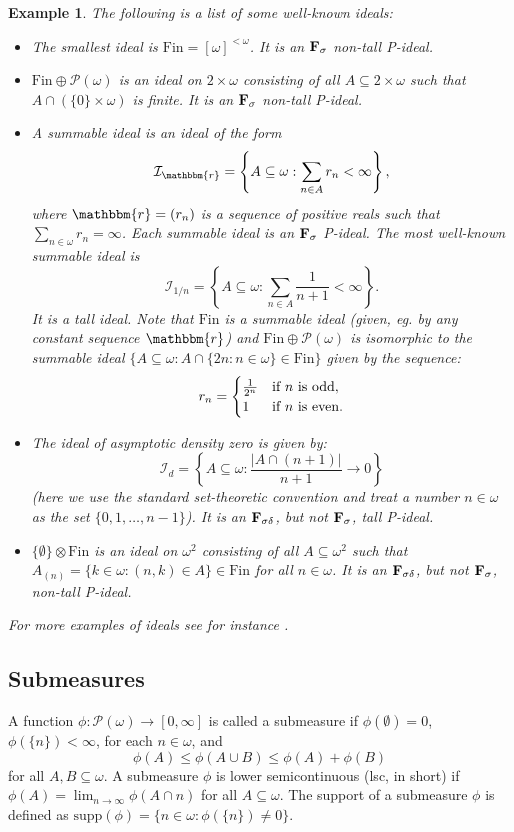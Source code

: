 \documentclass{amsart}
\newcommand{\I}{\mathcal{I}}
\newcommand{\Fin}{\mathrm{Fin}}
\newcommand{\supp}{\mathrm{supp}}
\newcommand{\w}{\mathbbm}
\newtheorem{example}[theorem]{Example}
\begin{document}
\begin{example}
The following is a list of some well-known ideals:
\begin{itemize}
    \item The smallest ideal is $\Fin=[\omega]^{<\omega}$.  It is an $\bf{F_\sigma}$ non-tall P-ideal.
    \item $\Fin\oplus\mathcal{P}(\omega)$ is an ideal on $2\times\omega$ consisting of all $A\subseteq 2\times\omega$ such that $A\cap(\{0\}\times\omega)$ is finite. It is an $\bf{F_\sigma}$ non-tall P-ideal. 
    \item A summable ideal is an ideal of the form
\[
\I_{\w{r}}=\left\{A\subseteq\omega:\sum_{n\in A}r_n<\infty\right\},
\]
where $\w{r}=(r_n)$ is a sequence of positive reals such that $\sum_{n\in\omega}r_n=\infty$. Each summable ideal is an $\bf{F_\sigma}$ P-ideal. The most well-known summable ideal is
\[
\I_{1/n}=\left\{A\subseteq\omega:\sum_{n\in A}\frac{1}{n+1}<\infty\right\}.
\]
It is a tall ideal. Note that $\Fin$ is a summable ideal (given, eg. by any constant sequence $\w{r}$) and $\Fin\oplus\mathcal{P}(\omega)$ is isomorphic to the summable ideal $\{A\subseteq\omega: A\cap\{2n:n\in\omega\}\in\Fin\}$ given by the sequence:
\[
r_n=\begin{cases}
    \frac{1}{2^n} & \text{if }n\text{ is odd},\cr
    1 & \text{if }n\text{ is even}.
\end{cases}
\]
\item The ideal of asymptotic density zero is given by:
\[
\I_d= \left\{A \subseteq \omega: \frac{|A \cap (n+1)|}{n+1} \to 0 \right\}
\]
(here we use the standard set-theoretic convention and treat a number $n\in\omega$ as the set $\{0,1,\ldots,n-1\}$). It is an $\bf{F_{\sigma\delta}}$, but not $\bf{F_{\sigma}}$, tall P-ideal. 
\item $\{\emptyset\}\otimes\Fin$ is an ideal on $\omega^2$ consisting of all $A\subseteq\omega^2$ such that $A_{(n)}=\{k\in\omega: (n,k)\in A\}\in\Fin$ for all $n\in\omega$.  It is an $\bf{F_{\sigma\delta}}$, but not $\bf{F_{\sigma}}$, non-tall P-ideal. 
\end{itemize}
For more examples of ideals see for instance \cite{Farah}.
\end{example}

\subsection{Submeasures}

A function $\phi:\mathcal{P}(\omega)\to[0,\infty]$ is called a submeasure if $\phi(\emptyset)=0$, $\phi(\{n\})<\infty$, for each $n\in\omega$, and 
$$\phi(A)\leq\phi(A\cup B)\leq\phi(A)+\phi(B)$$
for all $A,B\subseteq\omega$. A submeasure $\phi$ is lower semicontinuous (lsc, in short) if $\phi(A)=\lim_{n\to\infty}\phi(A\cap n)$ for all $A\subseteq\omega$. The support of a submeasure $\phi$ is defined as $\supp(\phi)=\{n\in\omega: \phi(\{n\})\neq 0\}$.
\end{document}
